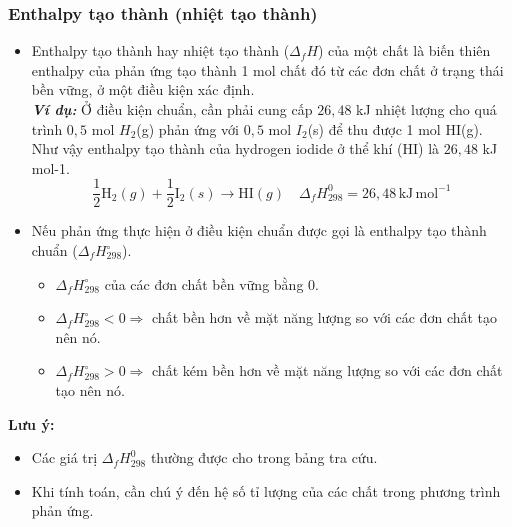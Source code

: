 \documentclass[Main.tex]{subfiles}
\begin{document}
	\subsubsection{Enthalpy tạo thành (nhiệt tạo thành)}
	\begin{ghinho}
		\begin{itemize}
			\item Enthalpy tạo thành hay nhiệt tạo thành ($\Delta_fH$) của một chất là biến thiên enthalpy của phản ứng tạo thành 1 mol chất đó từ các đơn chất ở trạng thái bền vững, ở một điều kiện xác định.\\[6pt]
			\textbf{\textit{Ví dụ:}} Ở điều kiện chuẩn, cần phải cung cấp $26{,}48$ kJ nhiệt lượng cho quá trình $0{,}5$ mol $H_2$(g) phản ứng với $0{,}5$ mol $I_2$(s) để thu được 1 mol HI(g).
			Như vậy enthalpy tạo thành của hydrogen iodide ở thể khí
			(HI) là $26{,}48$ kJ mol-1.
			\[
			\frac{1}{2}\mathrm{H}_{2}(g) + \frac{1}{2}\mathrm{I}_{2}(s) \rightarrow \mathrm{HI}(g) \quad \Delta_f H_{298}^{0} = 26,48 \, \mathrm{kJ} \, \mathrm{mol}^{-1}
			\]
			\item Nếu phản ứng thực hiện ở điều kiện chuẩn được gọi là enthalpy tạo thành chuẩn ($\Delta_fH^\circ_{298}$).
			\begin{itemize}
				\item $\Delta_fH^\circ_{298}$ của các đơn chất bền vững bằng 0.
				\item $\Delta_fH^\circ_{298} < 0 \Rightarrow$ chất bền hơn về mặt năng lượng so với các đơn chất tạo nên nó.
				\item $\Delta_fH^\circ_{298} > 0 \Rightarrow$ chất kém bền hơn về mặt năng lượng so với các đơn chất tạo nên nó.
			\end{itemize}
		\end{itemize}
	\end{ghinho}
	\begin{hopdongian}
		\textbf{Lưu ý:}
		\begin{itemize}
			\item Các giá trị $\Delta_fH^0_{298}$ thường được cho trong bảng tra cứu.
			\item Khi tính toán, cần chú ý đến hệ số tỉ lượng của các chất trong phương trình phản ứng.
		\end{itemize}
	\end{hopdongian}
\end{document}
